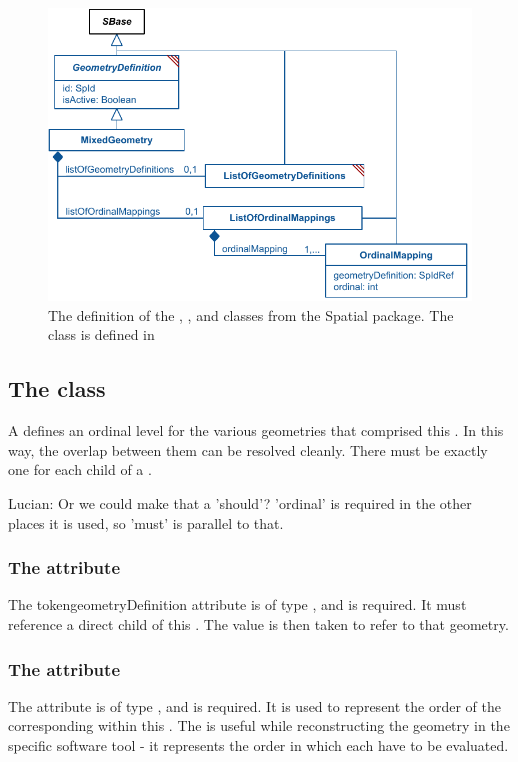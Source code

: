 \begin{figure}[ht]
  \includegraphics{figs/MixedGeometry-uml}
  \caption{The definition of the \MixedGeometry, \ListOfOrdinalMappings, and \OrdinalMapping classes from the Spatial package.  The \ListOfGeometryDefinitions class is defined in }
  \label{mixedgeometry-uml}
\end{figure}

\subsection{The  class}
\label{ordinalmapping-class}
A \OrdinalMapping defines an ordinal level for the various geometries that comprised this \MixedGeometry.  In this way, the overlap between them can be resolved cleanly.  There must be exactly one \OrdinalMapping for each child \GeometryDefinition of a \MixedGeometry.

{\color{red} Lucian: \notice Or we could make that a 'should'?  'ordinal' is required in the other places it is used, so 'must' is parallel to that.}


\subsubsection{The \fixttspace{} attribute}
The token{geometryDefinition} attribute is of type , and is required.  It must reference a direct child \GeometryDefinition of this \MixedGeometry.  The  value is then taken to refer to that geometry.


\subsubsection{The \fixttspace{} attribute}
The  attribute is of type , and is required. It is used to represent the order of the corresponding \GeometryDefinition within this \MixedGeometry.  The  is useful while reconstructing the geometry in the specific software tool - it represents the order in which each \GeometryDefinition have to be evaluated.

